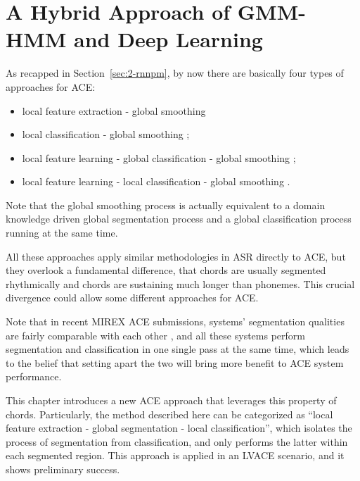 
\chapter{A Hybrid Approach of GMM-HMM and Deep Learning}\label{cp:ghmm} %


As recapped in Section~\ref{sec:2-rnnpm}, by now there are basically four types of approaches for ACE:
\begin{itemize}
\item local feature extraction - global smoothing \cite{fujishima1999realtime,sheh2003chord}
\item local classification - global smoothing \cite{humphrey2012rethinking};
\item local feature learning - global classification - global smoothing \cite{boulanger2013audio,sigtia2015audio};
\item local feature learning - local classification - global smoothing \cite{zhou2015chord}.
\end{itemize}
Note that the global smoothing process is actually equivalent to a domain knowledge driven global segmentation process and a global classification process running at the same time.

All these approaches apply similar methodologies in ASR \cite{deng2014deep,bourlard2012connectionist} directly to ACE, but they overlook a fundamental difference, that chords are usually segmented rhythmically and chords are sustaining much longer than phonemes. This crucial divergence could allow some different approaches for ACE.

Note that in recent MIREX ACE submissions, systems' segmentation qualities are fairly comparable with each other \cite{burgoyne2014comparative}, and all these systems perform segmentation and classification in one single pass at the same time, which leads to the belief that setting apart the two will bring more benefit to ACE system performance.

This chapter introduces a new ACE approach that leverages this property of chords. Particularly, the method described here can be categorized as ``local feature extraction - global segmentation - local classification'', which isolates the process of segmentation from classification, and only performs the latter within each segmented region. This approach is applied in an LVACE scenario, and it shows preliminary success.

